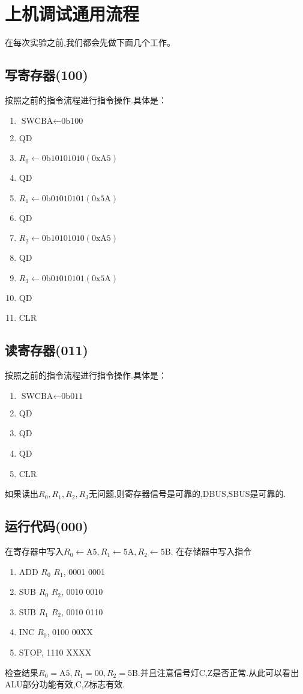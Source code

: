\documentclass[UTF8]{ctexart}
\begin{document}
\newpage
\section{上机调试通用流程}
在每次实验之前,我们都会先做下面几个工作。
\subsection{写寄存器(100)}
按照之前的指令流程进行指令操作.具体是：
\begin{enumerate}
	\item $\text{SWCBA}\leftarrow \text{0b100}$
	\item QD
	\item $R_0\leftarrow \text{0b10101010}(\text{0xA5})$
	\item QD
	\item $R_1\leftarrow \text{0b01010101}(\text{0x5A})$
	\item QD
	\item $R_2\leftarrow \text{0b10101010}(\text{0xA5})$
	\item QD
	\item $R_3\leftarrow \text{0b01010101}(\text{0x5A})$
	\item QD
	\item CLR
\end{enumerate}
\subsection{读寄存器(011)}
按照之前的指令流程进行指令操作.具体是：
\begin{enumerate}
	\item $\text{SWCBA}\leftarrow \text{0b011}$
	\item QD
	\item QD
	\item QD
	\item CLR
\end{enumerate}
如果读出$R_0,R_1,R_2,R_3$无问题,则寄存器信号是可靠的,DBUS,SBUS是可靠的.
\subsection{运行代码(000)}
在寄存器中写入$R_0\leftarrow \text{A5}, R_1\leftarrow \text{5A}, R_2\leftarrow \text{5B}$.
在存储器中写入指令
\begin{enumerate}[\indent\indent]
	\item ADD $R_0$ $R_1$, 0001 0001
	\item SUB $R_0$ $R_2$, 0010 0010
	\item SUB $R_1$ $R_2$, 0010 0110
	\item INC $R_0$, 0100 00XX
	\item STOP, 1110 XXXX
\end{enumerate}
检查结果$R_0 = \text{A5}, R_1 = \text{00}, R_2 = \text{5B}$.并且注意信号灯C,Z是否正常.从此可以看出ALU部分功能有效,C,Z标志有效.
\end{document}

